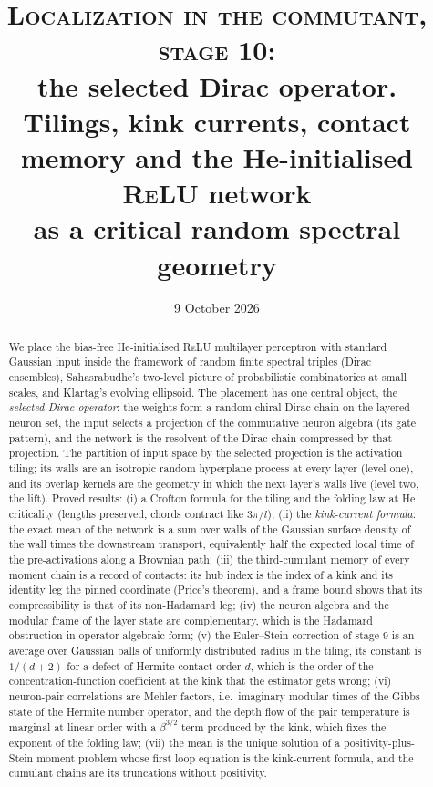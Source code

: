 \documentclass[11pt]{article}
\title{\textsc{Localization in the commutant, stage 10:}\\ \large the selected Dirac operator.\\
Tilings, kink currents, contact memory and the He-initialised \textsc{ReLU} network\\ as a critical random spectral geometry}
\author{}
\date{9 October 2026}
\theoremstyle{plain}
\theoremstyle{definition}\newtheorem{definition}[theorem]{Definition}\newtheorem{remark}[theorem]{Remark}
\begin{document}
\maketitle
\begin{abstract}
We place the bias-free He-initialised \textsc{ReLU} multilayer perceptron with standard Gaussian input inside the
framework of random finite spectral triples (Dirac ensembles), Sahasrabudhe's two-level picture of probabilistic
combinatorics at small scales, and Klartag's evolving ellipsoid. The placement has one central object, the
\emph{selected Dirac operator}: the weights form a random chiral Dirac chain on the layered neuron set, the input
selects a projection of the commutative neuron algebra (its gate pattern), and the network is the resolvent of the
Dirac chain compressed by that projection. The partition of input space by the selected projection is the
activation tiling; its walls are an isotropic random hyperplane process at every layer (level one), and its overlap
kernels are the geometry in which the next layer's walls live (level two, the lift). Proved results:
(i) a Crofton formula for the tiling and the folding law at He criticality (lengths preserved, chords contract like
$3\pi/l$); (ii) the \emph{kink-current formula}: the exact mean of the network is a sum over walls of the Gaussian
surface density of the wall times the downstream transport, equivalently half the expected local time of the
pre-activations along a Brownian path; (iii) the third-cumulant memory of every moment chain is a record of
contacts: its hub index is the index of a kink and its identity leg the pinned coordinate (Price's theorem), and
a frame bound shows that its compressibility is that of its non-Hadamard leg; (iv) the neuron algebra and the
modular frame of the layer state are complementary, which is the Hadamard obstruction in operator-algebraic form;
(v) the Euler--Stein correction of stage 9 is an average over Gaussian balls of uniformly distributed radius in the
tiling, its constant is $1/(d+2)$ for a defect of Hermite contact order $d$, which is the order of the
concentration-function coefficient at the kink that the estimator gets wrong; (vi) neuron-pair correlations are
Mehler factors, i.e.\ imaginary modular times of the Gibbs state of the Hermite number operator, and the depth flow
of the pair temperature is marginal at linear order with a $\beta^{3/2}$ term produced by the kink, which fixes the
exponent of the folding law; (vii) the mean is the unique solution of a positivity-plus-Stein moment problem whose
first loop equation is the kink-current formula, and the cumulant chains are its truncations without positivity.

\end{abstract}
\end{document}
